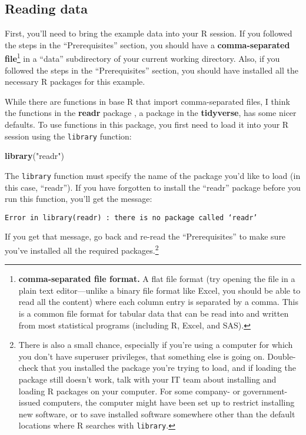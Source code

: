 \documentclass[]{tufte-book}
\newenvironment{Shaded}{}{}
\newcommand{\KeywordTok}[1]{\textcolor[rgb]{0.00,0.44,0.13}{\textbf{#1}}}
\newcommand{\NormalTok}[1]{#1}
\newcommand{\StringTok}[1]{\textcolor[rgb]{0.25,0.44,0.63}{#1}}
\begin{document}
\hypertarget{reading-data}{%
\subsection{Reading data}\label{reading-data}}

First, you'll need to bring the example data into your R session. If you followed
the steps in the ``Prerequisites'' section, you should have a
\textbf{comma-separated file}\footnote{\textbf{comma-separated file format.} A flat file format
  (try opening the file in a plain text editor---unlike a binary file format like
  Excel, you should be able to read all the content) where each column entry is
  separated by a comma. This is a common file format for tabular data that can
  be read into and written from most statistical programs (including R, Excel, and
  SAS).} in a ``data'' subdirectory of your current working directory. Also, if you
followed the steps in the ``Prerequisites'' section, you should have installed
all the necessary R packages for this example.

While there are functions in base R that import comma-separated files, I think the
functions in the \textbf{readr} package \citep{R-readr}, a package in the \textbf{tidyverse},
has some nicer defaults. To use functions in this package, you first need to load
it into your R session using the \texttt{library} function:

\begin{Shaded}
\begin{Highlighting}[]
\KeywordTok{library}\NormalTok{(}\StringTok{"readr"}\NormalTok{)}
\end{Highlighting}
\end{Shaded}

The \texttt{library} function must specify the name of the package you'd like to load (in
this case, ``readr''). If you have forgotten to install the ``readr'' package before you
run this function, you'll get the message:

\begin{verbatim}
Error in library(readr) : there is no package called ‘readr’
\end{verbatim}

If you get that message, go back and re-read the ``Prerequisites'' to make sure you've
installed all the required packages.\footnote{There is also a small chance, especially if
  you're using a computer for which you don't have superuser privileges, that something
  else is going on. Double-check that you installed the package you're trying to load,
  and if loading the package still doesn't work, talk with your IT team about
  installing and loading R packages on your computer. For some company- or
  government-issued computers, the computer might have been set up to restrict
  installing new software, or to save installed software somewhere other than the
  default locations where R searches with \texttt{library}.}
\end{document}
